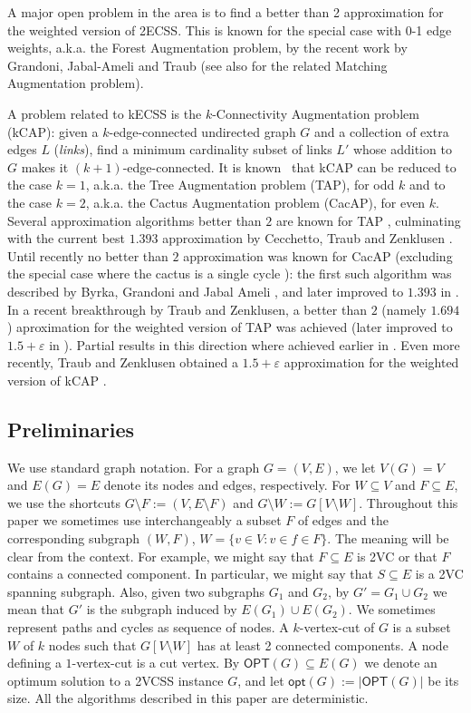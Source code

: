 \documentclass{theoretics}
\newcommand{\eps}{\varepsilon}
\newcommand{\OPT}{\mathsf{OPT}}
\newcommand{\opt}{\mathsf{opt}}
\begin{document}
A major open problem in the area is to find a better than 2 approximation for the weighted version of 2ECSS. This is known for the special case with 0-1 edge weights, a.k.a. the Forest Augmentation problem, by the recent work by Grandoni, Jabal-Ameli and Traub \cite{GJT22} (see also \cite{BDS22,CDGKN20,CCDZ20} for the related Matching Augmentation problem). 


A problem related to kECSS is the $k$-Connectivity Augmentation problem (kCAP): given a $k$-edge-connected undirected graph $G$ and a collection of extra edges $L$ (\emph{links}), find a minimum cardinality subset of links $L'$ whose addition to $G$ makes it $(k+1)$-edge-connected. It is known~\cite{DKL76} that kCAP can be reduced to the case $k=1$, a.k.a. the Tree Augmentation problem (TAP), for odd $k$ and to the case $k=2$, a.k.a. the Cactus Augmentation problem (CacAP), for even $k$. Several approximation algorithms better than $2$ are known for TAP \cite{A17,CG18,CG18a,EFKN09,FGKS18,GKZ18,KN16,KN16b,N03}, culminating with the current best $1.393$ approximation by Cecchetto, Traub and Zenklusen \cite{CTZ21}. Until recently no better than $2$ approximation was known for CacAP (excluding the special case where the cactus is a single cycle \cite{GGJS19}): the first such algorithm was described by Byrka, Grandoni and Jabal Ameli \cite{BGJ20}, and later improved to $1.393$ in \cite{CTZ21}. In a recent breakthrough by Traub and Zenklusen, a better than $2$ (namely $1.694$) aproximation for the weighted version of TAP was achieved \cite{TZ21} (later improved to $1.5+\eps$ in \cite{TZ23}). Partial results in this direction where achieved earlier in \cite{A17,CN13,FGKS18,GKZ18,N17}. Even more recently, Traub and Zenklusen obtained a $1.5+\eps$ approximation for the weighted version of kCAP \cite{TZ23}.

\subsection{Preliminaries}\label{sec:preliminaries}

We use standard graph notation. For a graph $G=(V,E)$, we  let $V(G)=V$ and $E(G)=E$ denote its nodes and edges, respectively. For $W\subseteq V$ and $F\subseteq E$, we use the shortcuts $G\setminus F:=(V,E\setminus F)$ and $G\setminus W:=G[V\setminus W]$. Throughout this paper we sometimes use interchangeably a subset $F$ of edges and the corresponding subgraph $(W,F)$, $W=\{v\in V: v\in f\in F\}$. The meaning will be clear from the context. For example, we might say that $F\subseteq E$ is 2VC or that $F$ contains a connected component. In particular, we might say that $S\subseteq E$ is a 2VC spanning subgraph. Also, given two subgraphs $G_1$ and $G_2$, by $G'=G_1\cup G_2$ we mean that $G'$ is the subgraph induced by $E(G_1)\cup E(G_2)$. We sometimes represent paths and cycles as sequence of nodes. A $k$-vertex-cut of $G$ is a subset $W$ of $k$ nodes such that $G[V\setminus W]$ has at least 2 connected components. A node defining a $1$-vertex-cut is a cut vertex. By $\OPT(G)\subseteq E(G)$ we denote an optimum solution to a 2VCSS instance $G$, and let $\opt(G):=|\OPT(G)|$ be its size. All the algorithms described in this paper are deterministic.
\end{document}
